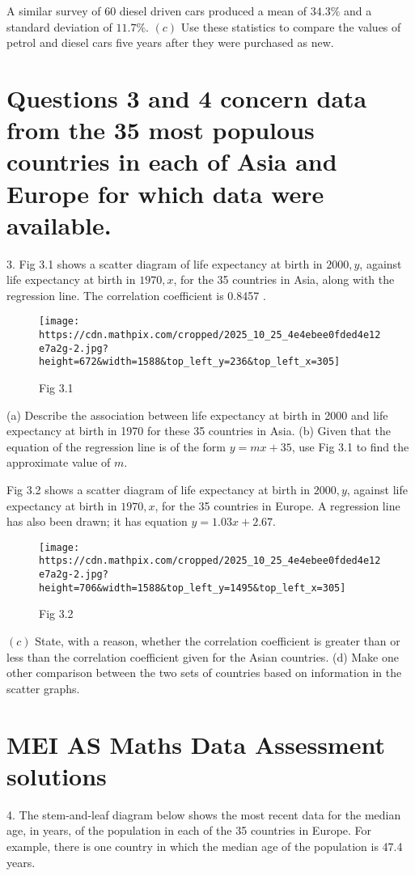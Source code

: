 A similar survey of 60 diesel driven cars produced a mean of $34.3 \%$ and a standard deviation of $11.7 \%$.
\((c)\) Use these statistics to compare the values of petrol and diesel cars five years after they were purchased as new.

\section*{Questions 3 and 4 concern data from the 35 most populous countries in each of Asia and Europe for which data were available.}
3. Fig 3.1 shows a scatter diagram of life expectancy at birth in $2000, y$, against life expectancy at birth in $1970, x$, for the 35 countries in Asia, along with the regression line. The correlation coefficient is 0.8457 .

\begin{figure}
\texttt{[image: https://cdn.mathpix.com/cropped/2025\_10\_25\_4e4ebee0fded4e12e7a2g-2.jpg?height=672\&width=1588\&top\_left\_y=236\&top\_left\_x=305]}
\captionsetup{labelformat=empty}
\caption{Fig 3.1}
\end{figure}
(a) Describe the association between life expectancy at birth in 2000 and life expectancy at birth in 1970 for these 35 countries in Asia.
(b) Given that the equation of the regression line is of the form $y=m x+35$, use Fig 3.1 to find the approximate value of $m$.

Fig 3.2 shows a scatter diagram of life expectancy at birth in $2000, y$, against life expectancy at birth in $1970, x$, for the 35 countries in Europe. A regression line has also been drawn; it has equation $y=1.03 x+2.67$.

\begin{figure}
\texttt{[image: https://cdn.mathpix.com/cropped/2025\_10\_25\_4e4ebee0fded4e12e7a2g-2.jpg?height=706\&width=1588\&top\_left\_y=1495\&top\_left\_x=305]}
\captionsetup{labelformat=empty}
\caption{Fig 3.2}
\end{figure}
\((c)\) State, with a reason, whether the correlation coefficient is greater than or less than the correlation coefficient given for the Asian countries.
(d) Make one other comparison between the two sets of countries based on information in the scatter graphs.

\section*{MEI AS Maths Data Assessment solutions}
4. The stem-and-leaf diagram below shows the most recent data for the median age, in years, of the population in each of the 35 countries in Europe. For example, there is one country in which the median age of the population is 47.4 years.

